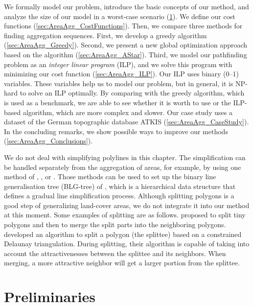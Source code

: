 We formally model our problem, 
introduce the basic concepts of our method, 
and analyze the size of our model in a worst-case scenario
(\sect\ref{sec:AreaAgg_Preliminaries}).
We define our cost functions 
(\sect\ref{sec:AreaAgg_CostFunctions}).
Then, we compare three methods for finding aggregation sequences.
First, we develop 
a greedy algorithm (\sect\ref{sec:AreaAgg_Greedy}).
Second, we present a new global optimization approach
based on the \Astar algorithm 
(\sect\ref{sec:AreaAgg_AStar}).
Third, we model our pathfinding problem as
an \emph{integer linear program} (ILP), 
and we solve this program with minimizing our cost function
(\sect\ref{sec:AreaAgg_ILP}).
Our ILP uses binary (0--1) variables. 
These variables help us to model our problem, 
but in general, it is NP-hard 
to solve an ILP optimally.
By comparing with the greedy algorithm, 
which is used as a benchmark,
we are able to see whether it is worth 
to use \Astar or the ILP-based algorithm, 
which are more complex and slower.  
Our case study 
uses a dataset of the German topographic database ATKIS 
(\sect\ref{sec:AreaAgg_CaseStudy}).
In the concluding remarks, we show possible ways to improve our 
methods (\sect\ref{sec:AreaAgg_Conclusions}). 

We do not deal with simplifying polylines in this chapter.
The simplification can be handled separately from the
aggregation of areas, for example, 
by using one method of 
\textcite{Douglas1973},
\textcite{Saalfeld1999},
or \textcite{Wu2004DP}.
Those methods can be used to set up 
the binary line generalisation tree (BLG-tree) of
\textcite{vanOosterom1995Development},
which is a hierarchical data structure that 
defines a gradual line simplification process.
%
Although splitting polygons is a good step
of generalizing land-cover areas,
we do not integrate it into our method at this moment.
Some examples of splitting are as follows.
\textcite{Smith2007MasterMap,Thiemann2018LandCover} 
proposed to split tiny polygons 
and then to merge the split parts into the neighboring polygons.
\textcite{Meijers2016Split} developed an algorithm 
to split a polygon (the splittee) 
based on a constrained Delaunay triangulation.
During splitting, their algorithm is capable of
taking into account
the attractivenesses between the splittee and its neighbors.
When merging, a more attractive neighbor 
will get a larger portion from the splittee.


\section{Preliminaries}
\label{sec:AreaAgg_Preliminaries}

